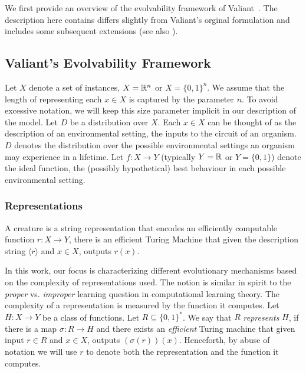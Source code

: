 We first provide an overview of the evolvability framework of
Valiant~\cite{Valiant:2009-evolvability}. The description here contains differs
slightly from Valiant's orginal formulation and includes some subsequent
extensions (see also \cite{Feldman:2008-evolvability, Feldman:2009-robustness,
Valiant:2012-real, Kanade:2012-thesis}).

\subsection{Valiant's Evolvability Framework}

Let $X$ denote a set of instances, \eg $X = \mathbb{R}^n$ or $X = \{0, 1\}^n$. We
assume that the length of representing each $x \in X$ is captured by the
parameter $n$. To avoid excessive notation, we will keep this size parameter
implicit in our description of the model. Let $D$ be a distribution over $X$.
Each $x \in X$ can be thought of as the description of an environmental setting,
the inputs to the circuit of an organism. $D$ denotes the distribution over the
possible environmental settings an organism may experience in a lifetime. Let $f
: X \rightarrow Y$ (typically $Y = \mathbb{R}$ or $Y = \{0, 1\}$) denote the ideal
function, the (possibly hypothetical) best behaviour in each possible
environmental setting.

\subsubsection*{Representations}

A creature is a string representation that encodes an efficiently computable
function $r : X \rightarrow Y$, \ie there is an efficient Turing Machine that
given the description string $\langle r \rangle$ and $x \in X$, outputs $r(x)$.  

In this work, our focus is characterizing different evolutionary mechanisms
based on the complexity of representations used. The notion is similar in spirit
to the \emph{proper} vs. \emph{improper} learning question in computational
learning theory. The complexity of a representation is measured by the function
it computes.  Let $H : X \rightarrow Y$ be a class of functions. Let $R
\subseteq \{0, 1\}^*$.  We say that $R$ \emph{represents} $H$, if there is a map
$\sigma : R \rightarrow H$ and there exists an \emph{efficient} Turing machine
that given input $r \in R$ and $x \in X$, outputs $(\sigma(r))(x)$. Henceforth,
by abuse of notation we will use $r$ to denote both the representation and the
function it computes.

